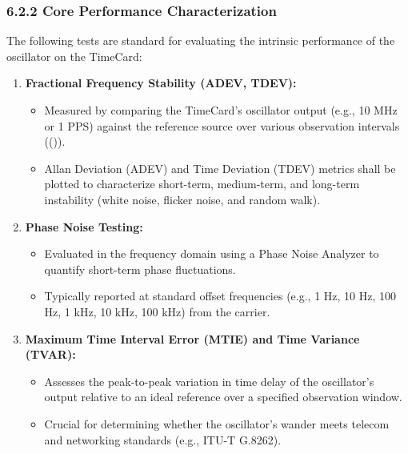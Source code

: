 \subsubsection{6.2.2 Core Performance
Characterization}\label{core-performance-characterization}

The following tests are standard for evaluating the intrinsic
performance of the oscillator on the TimeCard:

\begin{enumerate}
\def\labelenumi{\arabic{enumi}.}
\tightlist
\item
  \textbf{Fractional Frequency Stability (ADEV, TDEV):}

  \begin{itemize}
  \tightlist
  \item
    Measured by comparing the TimeCard's oscillator output (e.g., 10 MHz
    or 1 PPS) against the reference source over various observation
    intervals ((\tau)).
  \item
    Allan Deviation (ADEV) and Time Deviation (TDEV) metrics shall be
    plotted to characterize short-term, medium-term, and long-term
    instability (white noise, flicker noise, and random walk).
  \end{itemize}
\item
  \textbf{Phase Noise Testing:}

  \begin{itemize}
  \tightlist
  \item
    Evaluated in the frequency domain using a Phase Noise Analyzer to
    quantify short-term phase fluctuations.
  \item
    Typically reported at standard offset frequencies (e.g., 1 Hz, 10
    Hz, 100 Hz, 1 kHz, 10 kHz, 100 kHz) from the carrier.
  \end{itemize}
\item
  \textbf{Maximum Time Interval Error (MTIE) and Time Variance (TVAR):}

  \begin{itemize}
  \tightlist
  \item
    Assesses the peak-to-peak variation in time delay of the
    oscillator's output relative to an ideal reference over a specified
    observation window.
  \item
    Crucial for determining whether the oscillator's wander meets
    telecom and networking standards (e.g., ITU-T G.8262).
  \end{itemize}
\end{enumerate}

